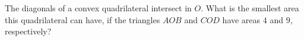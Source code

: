 The diagonals of a convex quadrilateral intersect in $O$. What is the smallest area this quadrilateral can have, if the triangles $AOB$ and $COD$ have areas $4$ and $9$, respectively?
